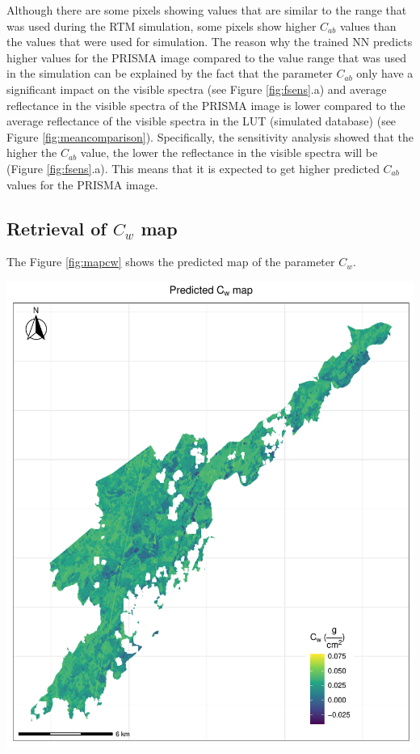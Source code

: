 \documentclass[a4paper, twoside]{templates/ociamthesis}
\let\origfigure\figure
\let\endorigfigure\endfigure
\renewenvironment{figure}[1][2] {
    \expandafter\origfigure\expandafter[H]
} {
    \endorigfigure
}
\begin{document}
Although there are some pixels showing values that are similar to the range that was used during the RTM simulation, some pixels show higher \(C_{ab}\) values than the values that were used for simulation. The reason why the trained NN predicts higher values for the PRISMA image compared to the value range that was used in the simulation can be explained by the fact that the parameter \(C_{ab}\) only have a significant impact on the visible spectra (see Figure \ref{fig:fsens}.a) and average reflectance in the visible spectra of the PRISMA image is lower compared to the average reflectance of the visible spectra in the LUT (simulated database) (see Figure \ref{fig:meancomparison}). Specifically, the sensitivity analysis showed that the higher the \(C_{ab}\) value, the lower the reflectance in the visible spectra will be (Figure \ref{fig:fsens}.a). This means that it is expected to get higher predicted \(C_{ab}\) values for the PRISMA image.

\newpage

\hypertarget{retrieval-of-c_w-map}{%
\subsection{\texorpdfstring{Retrieval of \(C_{w}\) map}{Retrieval of C\_\{w\} map}}\label{retrieval-of-c_w-map}}

The Figure \ref{fig:mapcw} shows the predicted map of the parameter \(C_{w}\).

\begin{figure}
\includegraphics[width=0.9\linewidth]{./figures/cw_map} \caption{Predicted map of the parameter $C_{w}$}\label{fig:mapcw}
\end{figure}
\end{document}
